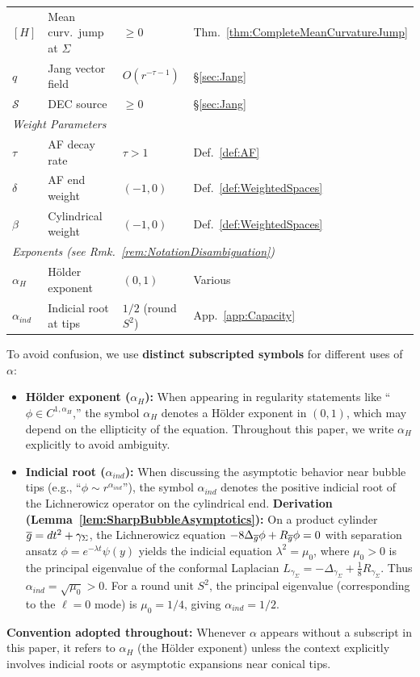 \begin{center}
\begin{tabular}{p{2.2cm}p{4.8cm}p{2.5cm}p{2cm}}
$[H]$ & Mean curv.\ jump at $\Sigma$ & $\ge 0$ & Thm.~\ref{thm:CompleteMeanCurvatureJump} \\
$q$ & Jang vector field & $O(r^{-\tau-1})$ & \S\ref{sec:Jang} \\
$\mathcal{S}$ & DEC source & $\ge 0$ & \S\ref{sec:Jang} \\
\midrule
\multicolumn{4}{l}{\textit{Weight Parameters}} \\
$\tau$ & AF decay rate & $\tau > 1$ & Def.~\ref{def:AF} \\
$\delta$ & AF end weight & $(-1, 0)$ & Def.~\ref{def:WeightedSpaces} \\
$\beta$ & Cylindrical weight & $(-1, 0)$ & Def.~\ref{def:WeightedSpaces} \\
\midrule
\multicolumn{4}{l}{\textit{Exponents (see Rmk.~\ref{rem:NotationDisambiguation})}} \\
$\alpha_H$ & H\"older exponent & $(0,1)$ & Various \\
$\alpha_{ind}$ & Indicial root at tips & $1/2$ (round $S^2$) & App.~\ref{app:Capacity} \\
\bottomrule
\end{tabular}
\end{center}

\begin{remark}\label{rem:NotationDisambiguation}
To avoid confusion, we use \textbf{distinct subscripted symbols} for different uses of $\alpha$:
\begin{itemize}
    \item \textbf{H\"older exponent ($\alpha_H$):} When appearing in regularity statements like ``$\phi \in C^{1,\alpha_H}$,'' the symbol $\alpha_H$ denotes a H\"older exponent in $(0,1)$, which may depend on the ellipticity of the equation. Throughout this paper, we write $\alpha_H$ explicitly to avoid ambiguity.
    \item \textbf{Indicial root ($\alpha_{ind}$):} When discussing the asymptotic behavior near bubble tips (e.g., ``$\phi \sim r^{\alpha_{ind}}$''), the symbol $\alpha_{ind}$ denotes the positive indicial root of the Lichnerowicz operator on the cylindrical end. \textbf{Derivation (Lemma~\ref{lem:SharpBubbleAsymptotics}):} On a product cylinder $\overline{g} = dt^2 + \gamma_\Sigma$, the Lichnerowicz equation $-8\Delta_{\overline{g}}\phi + R_{\overline{g}}\phi = 0$ with separation ansatz $\phi = e^{-\lambda t}\psi(y)$ yields the indicial equation $\lambda^2 = \mu_0$, where $\mu_0 > 0$ is the principal eigenvalue of the conformal Laplacian $L_{\gamma_\Sigma} = -\Delta_{\gamma_\Sigma} + \frac{1}{8}R_{\gamma_\Sigma}$. Thus $\alpha_{ind} = \sqrt{\mu_0} > 0$. For a round unit $S^2$, the principal eigenvalue (corresponding to the $\ell=0$ mode) is $\mu_0 = 1/4$, giving $\alpha_{ind} = 1/2$.
\end{itemize}
\textbf{Convention adopted throughout:} Whenever $\alpha$ appears without a subscript in this paper, it refers to $\alpha_H$ (the H\"older exponent) unless the context explicitly involves indicial roots or asymptotic expansions near conical tips.
\end{remark}

